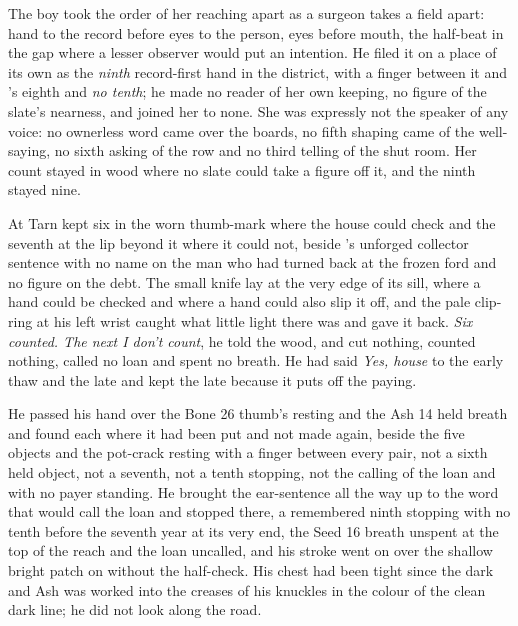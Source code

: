 The boy took the order of her reaching apart as a surgeon takes a field apart: hand to the record before eyes to the person, eyes before mouth, the half-beat in the gap where a lesser observer would put an intention. He filed it on a place of its own as the \emph{ninth} record-first hand in the district, with a finger between it and 's eighth and \emph{no tenth}; he made no reader of her own keeping, no figure of the slate's nearness, and joined her to none. She was expressly not the speaker of any voice: no ownerless word came over the boards, no fifth shaping came of the well-saying, no sixth asking of the row and no third telling of the shut room. Her count stayed in wood where no slate could take a figure off it, and the ninth stayed nine.

\scenebreak

At  Tarn kept six in the worn thumb-mark where the house could check and the seventh at the lip beyond it where it could not, beside 's unforged collector sentence with no name on the man who had turned back at the frozen ford and no figure on the debt. The small knife lay at the very edge of its sill, where a hand could be checked and where a hand could also slip it off, and the pale clip-ring at his left wrist caught what little light there was and gave it back. \emph{Six counted. The next I don't count}, he told the wood, and cut nothing, counted nothing, called no loan and spent no breath. He had said \emph{Yes, house} to the early thaw and the late and kept the late because it puts off the paying.

He passed his hand over the Bone 26 thumb's resting and the Ash 14 held breath and found each where it had been put and not made again, beside the five objects and the pot-crack resting with a finger between every pair, not a sixth held object, not a seventh, not a tenth stopping, not the calling of the loan and with no payer standing. He brought the ear-sentence all the way up to the word that would call the loan and stopped there, a remembered ninth stopping with no tenth before the seventh year at its very end, the Seed 16 breath unspent at the top of the reach and the loan uncalled, and his stroke went on over the shallow bright patch on  without the half-check. His chest had been tight since the dark and Ash was worked into the creases of his knuckles in the colour of the clean dark line; he did not look along the road.

